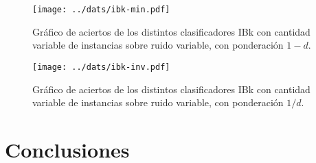 \documentclass[a4paper,10pt]{article}
\begin{document}
\begin{figure}
\centering
\texttt{[image: ../dats/ibk-min.pdf]}
\caption{Gráfico de aciertos de los distintos clasificadores \textsf{IBk} con cantidad variable de instancias sobre ruido variable, con ponderación $1-d$.}
\end{figure}

\begin{figure}
\centering
\texttt{[image: ../dats/ibk-inv.pdf]}
\caption{Gráfico de aciertos de los distintos clasificadores \textsf{IBk} con cantidad variable de instancias sobre ruido variable, con ponderación $1/d$.}
\end{figure}
\section{Conclusiones}
\end{document}
